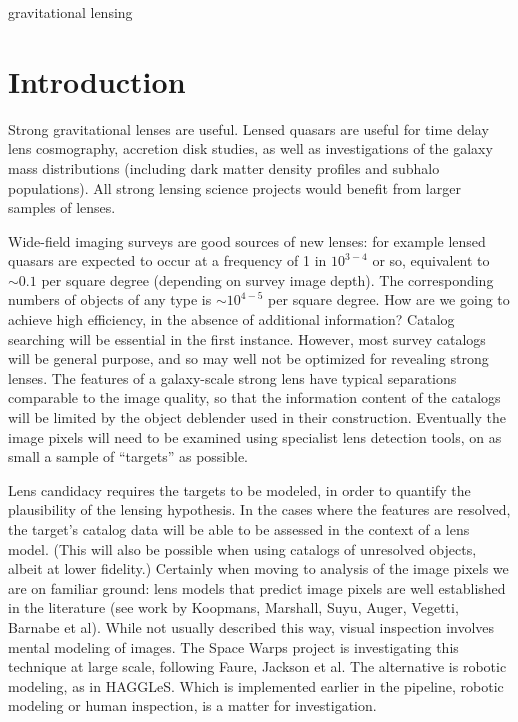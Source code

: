\documentclass[useAMS,usenatbib]{mn2e}
\begin{document}

\begin{keywords}
  gravitational lensing
\end{keywords}

\setcounter{footnote}{1}


\section{Introduction}
\label{sec:intro}

Strong gravitational lenses are useful. Lensed quasars are useful for time
delay lens cosmography, accretion disk studies, as well as investigations
of the galaxy mass distributions (including dark matter density profiles
and subhalo populations). All strong lensing science projects would benefit
from larger samples of lenses. 

Wide-field imaging surveys are good sources of new lenses: for example 
lensed quasars are expected to occur at a frequency of 1 in $10^{3-4}$ or
so, equivalent to $\sim0.1$ per square degree (depending on survey image
depth). The corresponding numbers of objects of any type is $\sim10^{4-5}$
per square degree. How are we going to achieve high efficiency, in the
absence of additional information? Catalog searching will be essential in
the first instance.  However, most survey catalogs will be general purpose,
and so may well not be optimized for revealing strong lenses. The features
of a galaxy-scale strong lens have typical  separations comparable to the
image quality, so that the information content of the catalogs will be
limited by the object deblender used in their construction. Eventually the
image pixels will need to be examined using specialist lens detection
tools, on as small a sample of ``targets'' as possible.

Lens candidacy requires the targets to be modeled, in order to quantify the
plausibility of the lensing hypothesis. In the cases where the features are
resolved, the target's catalog data will be able to be  assessed in the
context of a lens model. (This will also be possible when using catalogs of
unresolved  objects, albeit at lower fidelity.) Certainly when moving to
analysis of the image pixels we are on familiar ground: lens models that
predict image pixels are well established in the literature (see work by
Koopmans, Marshall, Suyu, Auger, Vegetti, Barnabe et al).  While not
usually described this way, visual inspection involves mental modeling of
images. The Space Warps project is investigating this technique at large
scale, following Faure, Jackson et al. The alternative is robotic modeling,
as in HAGGLeS. Which is implemented earlier in the pipeline, robotic
modeling or human inspection, is a matter for investigation.
\end{document}
